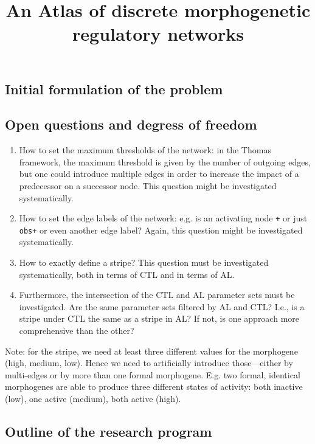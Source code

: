 \documentclass{article}
\begin{document}
\title{An Atlas of discrete morphogenetic regulatory networks}
\maketitle

\begin{flushleft}

\section{Initial formulation of the problem}

\subsection{Open questions and degress of freedom}

\begin{enumerate}
  \item How to set the maximum thresholds of the network: in the Thomas
  framework, the maximum threshold is given by the number of outgoing edges, but
  one could introduce multiple edges in order to increase the impact of a
  predecessor on a successor node. This question might be investigated
  systematically.
  \item How to set the edge labels of the network: e.g. is an activating node
  {\tt +} or just {\tt obs+} or even another edge label? Again, this question
  might be investigated systematically.
  \item How to exactly define a stripe? This question must be investigated
  systematically, both in terms of CTL and in terms of AL.
  \item Furthermore, the intersection of the CTL and AL parameter sets must be
  investigated. Are the same parameter sets filtered by AL and CTL? I.e., is a
  stripe under CTL the same as a stripe in AL? If not, is one approach more
  comprehensive than the other?
\end{enumerate}

Note: for the stripe, we need at least three different values for the morphogene
(high, medium, low). Hence we need to artificially introduce those---either by
multi-edges or by more than one formal morphogene. E.g. two formal, identical
morphogenes are able to produce three different states of activity: both
inactive (low), one active (medium), both active (high).

\subsection{Outline of the research program}


\end{flushleft}
\end{document}
